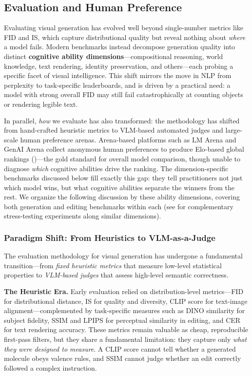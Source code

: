 \subsection{Evaluation and Human Preference}
\label{sec:benchmarks}

Evaluating visual generation has evolved well beyond single-number metrics like FID and IS, which capture distributional quality but reveal nothing about \emph{where} a model fails. Modern benchmarks instead decompose generation quality into distinct \textbf{cognitive ability dimensions}---compositional reasoning, world knowledge, text rendering, identity preservation, and others---each probing a specific facet of visual intelligence. This shift mirrors the move in NLP from perplexity to task-specific leaderboards, and is driven by a practical need: a model with strong overall FID may still fail catastrophically at counting objects or rendering legible text.

In parallel, \emph{how} we evaluate has also transformed: the methodology has shifted from hand-crafted heuristic metrics to VLM-based automated judges and large-scale human preference arenas. Arena-based platforms such as LM Arena and GenAI Arena collect anonymous human preferences to produce Elo-based global rankings ()---the gold standard for overall model comparison, though unable to diagnose \emph{which} cognitive abilities drive the ranking. The dimension-specific benchmarks discussed below fill exactly this gap: they tell practitioners not just which model wins, but what cognitive abilities separate the winners from the rest. We organize the following discussion by these ability dimensions, covering both generation and editing benchmarks within each (see  for complementary stress-testing experiments along similar dimensions).


\subsubsection{Paradigm Shift: From Heuristics to VLM-as-a-Judge}
\label{subsubsec:eval_paradigm}

The evaluation methodology for visual generation has undergone a fundamental transition---from \emph{fixed heuristic metrics} that measure low-level statistical properties to \emph{VLM-based judges} that assess high-level semantic correctness.

\textbf{The Heuristic Era.}
Early evaluation relied on distribution-level metrics---FID for distributional distance, IS for quality and diversity, CLIP score for text-image alignment---complemented by task-specific measures such as DINO similarity for subject fidelity, SSIM and LPIPS for perceptual similarity in editing, and CER for text rendering accuracy. These metrics remain valuable as cheap, reproducible first-pass filters, but they share a fundamental limitation: they capture only \emph{what they were designed to measure}. A CLIP score cannot tell whether a generated molecule obeys valence rules, and SSIM cannot judge whether an edit correctly followed a complex instruction.

